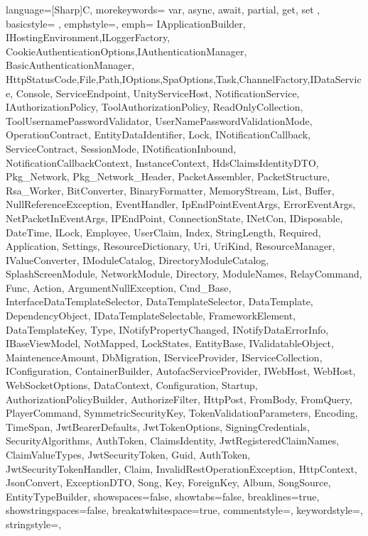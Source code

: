 {
	language=[Sharp]C,
	morekeywords={ var, async, await, partial, get, set }, %
	basicstyle=\ttfamily \color{black} \small \smaller,
	emphstyle={\color{vs_class}},
	emph={ IApplicationBuilder, IHostingEnvironment,ILoggerFactory, CookieAuthenticationOptions,IAuthenticationManager, BasicAuthenticationManager, HttpStatusCode,File,Path,IOptions,SpaOptions,Task,ChannelFactory,IDataService, Console, ServiceEndpoint, UnityServiceHost, NotificationService, IAuthorizationPolicy, ToolAuthorizationPolicy, ReadOnlyCollection, ToolUsernamePasswordValidator, UserNamePasswordValidationMode, OperationContract, EntityDataIdentifier, Lock, INotificationCallback, ServiceContract, SessionMode, INotificationInbound, NotificationCallbackContext, InstanceContext, HdsClaimsIdentityDTO, Pkg_Network, Pkg_Network_Header, PacketAssembler, PacketStructure, Rsa_Worker, BitConverter, BinaryFormatter, MemoryStream, List, Buffer, NullReferenceException, EventHandler, IpEndPointEventArgs, ErrorEventArgs, NetPacketInEventArgs, IPEndPoint, ConnectionState, INetCon, IDisposable, DateTime, ILock, Employee, UserClaim, Index, StringLength, Required, Application, Settings, ResourceDictionary, Uri, UriKind, ResourceManager, IValueConverter, IModuleCatalog, DirectoryModuleCatalog, SplashScreenModule, NetworkModule, Directory, ModuleNames, RelayCommand, Func, Action, ArgumentNullException, Cmd_Base, InterfaceDataTemplateSelector, DataTemplateSelector, DataTemplate, DependencyObject, IDataTemplateSelectable, FrameworkElement, DataTemplateKey, Type, INotifyPropertyChanged, INotifyDataErrorInfo, IBaseViewModel, NotMapped, LockStates, EntityBase, IValidatableObject, MaintenenceAmount, DbMigration, IServiceProvider, IServiceCollection, IConfiguration, ContainerBuilder, AutofacServiceProvider, IWebHost, WebHost, WebSocketOptions, DataContext, Configuration, Startup, AuthorizationPolicyBuilder, AuthorizeFilter, HttpPost, FromBody, FromQuery, PlayerCommand, SymmetricSecurityKey, TokenValidationParameters, Encoding, TimeSpan, JwtBearerDefaults, JwtTokenOptions, SigningCredentials, SecurityAlgorithms, AuthToken, ClaimsIdentity, JwtRegisteredClaimNames, ClaimValueTypes, JwtSecurityToken, Guid, AuthToken, JwtSecurityTokenHandler, Claim, InvalidRestOperationException, HttpContext, JsonConvert, ExceptionDTO, Song, Key, ForeignKey, Album, SongSource, EntityTypeBuilder}, %
	showspaces=false,
	showtabs=false,
	breaklines=true,
	showstringspaces=false,
	breakatwhitespace=true,
	commentstyle=\color{vs_comment},
	keywordstyle=\color{vs_keyword},
	stringstyle=\color{vs_string},
}

